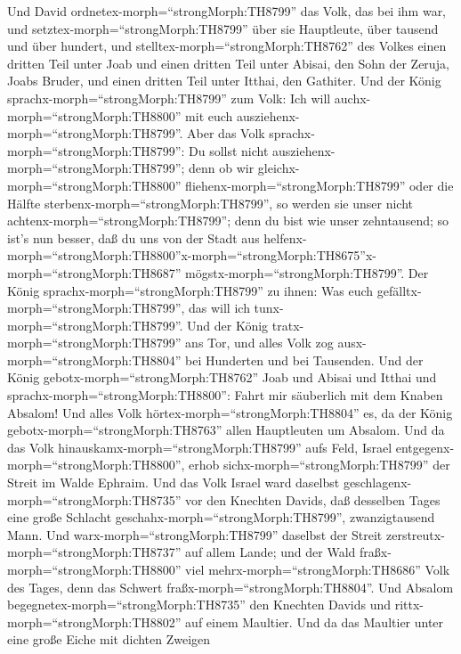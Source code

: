  Und David ordnetex-morph=``strongMorph:TH8799'' das Volk,
das bei ihm war, und setztex-morph=``strongMorph:TH8799'' über sie
Hauptleute, über tausend und über hundert,  und
stelltex-morph=``strongMorph:TH8762'' des Volkes einen dritten Teil
unter Joab und einen dritten Teil unter Abisai, den Sohn der Zeruja,
Joabs Bruder, und einen dritten Teil unter Itthai, den Gathiter. Und der
König sprachx-morph=``strongMorph:TH8799'' zum Volk: Ich will
auchx-morph=``strongMorph:TH8800'' mit euch
ausziehenx-morph=``strongMorph:TH8799''.  Aber das Volk
sprachx-morph=``strongMorph:TH8799'': Du sollst nicht
ausziehenx-morph=``strongMorph:TH8799''; denn ob wir
gleichx-morph=``strongMorph:TH8800''
fliehenx-morph=``strongMorph:TH8799'' oder die Hälfte
sterbenx-morph=``strongMorph:TH8799'', so werden sie unser nicht
achtenx-morph=``strongMorph:TH8799''; denn du bist wie unser
zehntausend; so ist's nun besser, daß du uns von der Stadt aus
helfenx-morph=``strongMorph:TH8800''\textbar x-morph=``strongMorph:TH8675''x-morph=``strongMorph:TH8687''
mögstx-morph=``strongMorph:TH8799''.  Der König
sprachx-morph=``strongMorph:TH8799'' zu ihnen: Was euch
gefälltx-morph=``strongMorph:TH8799'', das will ich
tunx-morph=``strongMorph:TH8799''. Und der König
tratx-morph=``strongMorph:TH8799'' ans Tor, und alles Volk zog
ausx-morph=``strongMorph:TH8804'' bei Hunderten und bei Tausenden.
 Und der König gebotx-morph=``strongMorph:TH8762'' Joab und
Abisai und Itthai und sprachx-morph=``strongMorph:TH8800'': Fahrt mir
säuberlich mit dem Knaben Absalom! Und alles Volk
hörtex-morph=``strongMorph:TH8804'' es, da der König
gebotx-morph=``strongMorph:TH8763'' allen Hauptleuten um Absalom.
 Und da das Volk hinauskamx-morph=``strongMorph:TH8799''
aufs Feld, Israel entgegenx-morph=``strongMorph:TH8800'', erhob
sichx-morph=``strongMorph:TH8799'' der Streit im Walde Ephraim.
 Und das Volk Israel ward daselbst
geschlagenx-morph=``strongMorph:TH8735'' vor den Knechten Davids, daß
desselben Tages eine große Schlacht
geschahx-morph=``strongMorph:TH8799'', zwanzigtausend Mann. 
Und warx-morph=``strongMorph:TH8799'' daselbst der Streit
zerstreutx-morph=``strongMorph:TH8737'' auf allem Lande; und der Wald
fraßx-morph=``strongMorph:TH8800'' viel
mehrx-morph=``strongMorph:TH8686'' Volk des Tages, denn das Schwert
fraßx-morph=``strongMorph:TH8804''.  Und Absalom
begegnetex-morph=``strongMorph:TH8735'' den Knechten Davids und
rittx-morph=``strongMorph:TH8802'' auf einem Maultier. Und da das
Maultier unter eine große Eiche mit dichten Zweigen
